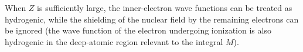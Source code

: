 When $Z$ is sufficiently large, the inner-electron wave functions can be treated as hydrogenic, while the shielding of the nuclear field by the remaining electrons can be ignored (the wave function of the electron undergoing ionization is also hydrogenic in the deep-atomic region relevant to the integral $M$).
